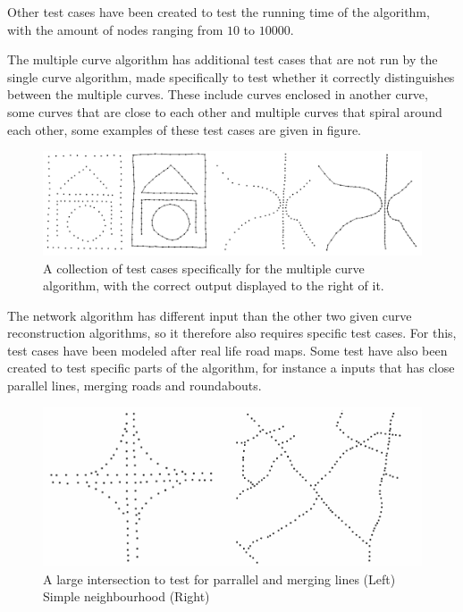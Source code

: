 \documentclass[11pt]{article}
\begin{document}
Other test cases have been created to test the running time of the algorithm, with the amount of nodes ranging from $10$ to $10000$.


The multiple curve algorithm has additional test cases that are not run by the single curve algorithm, made specifically to test whether it correctly distinguishes between the multiple curves. These include curves enclosed in another curve, some curves that are close to each other and multiple curves that spiral around each other, some examples of these test cases are given in figure. %

\begin{figure}[ht!]
\centering
\includegraphics[scale=0.3]{multiInput.png}
\caption{A collection of test cases specifically for the multiple curve algorithm, with the correct output displayed to the right of it.}
\label{multi}
\end{figure}

The network algorithm has different input than the other two given curve reconstruction algorithms, so it therefore also requires specific test cases. For this, test cases have been modeled after real life road maps. Some test have also been created to test specific parts of the algorithm, for instance a inputs that has close parallel lines, merging roads and roundabouts.

\begin{figure}[ht!]
\centering
\includegraphics[scale=0.3]{networkInput.png}
\caption{A large intersection to test for parrallel and merging lines (Left) Simple neighbourhood (Right)}
\label{network}
\end{figure}$ $\\
\end{document}
